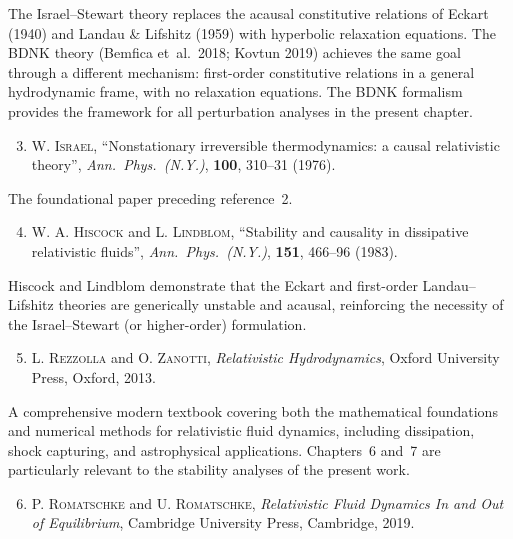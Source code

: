 \noindent The Israel--Stewart theory replaces the acausal constitutive
relations of Eckart (1940) and Landau \& Lifshitz (1959) with
hyperbolic relaxation equations.  The BDNK theory (Bemfica et~al.\
2018; Kovtun 2019) achieves the same goal through a different mechanism:
first-order constitutive relations in a general hydrodynamic frame, with
no relaxation equations.  The BDNK formalism provides the framework for
all perturbation analyses in the present chapter.

\begin{enumerate}
\setcounter{enumi}{2}

\item \textsc{W. Israel}, ``Nonstationary irreversible thermodynamics:
  a causal relativistic theory'',
  \textit{Ann.\ Phys.\ (N.Y.)}, \textbf{100}, 310--31 (1976).

\end{enumerate}

\noindent The foundational paper preceding reference~2.

\begin{enumerate}
\setcounter{enumi}{3}

\item \textsc{W. A. Hiscock} and \textsc{L. Lindblom}, ``Stability
  and causality in dissipative relativistic fluids'',
  \textit{Ann.\ Phys.\ (N.Y.)}, \textbf{151}, 466--96 (1983).

\end{enumerate}

\noindent Hiscock and Lindblom demonstrate that the Eckart and
first-order Landau--Lifshitz theories are generically unstable and
acausal, reinforcing the necessity of the Israel--Stewart (or higher-order)
formulation.

\begin{enumerate}
\setcounter{enumi}{4}

\item \textsc{L. Rezzolla} and \textsc{O. Zanotti},
  \textit{Relativistic Hydrodynamics}, Oxford University Press, Oxford,
  2013.

\end{enumerate}

\noindent A comprehensive modern textbook covering both the
mathematical foundations and numerical methods for relativistic fluid
dynamics, including dissipation, shock capturing, and astrophysical
applications.  Chapters~6 and~7 are particularly relevant to the
stability analyses of the present work.

\begin{enumerate}
\setcounter{enumi}{5}

\item \textsc{P. Romatschke} and \textsc{U. Romatschke},
  \textit{Relativistic Fluid Dynamics In and Out of Equilibrium},
  Cambridge University Press, Cambridge, 2019.

\end{enumerate}

